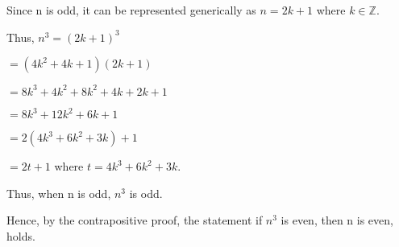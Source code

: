 \documentclass[a4paper,11pt]{article}
\begin{document}
\phantom{}

Since n is odd, it can be represented generically as $n = 2k+1$ where $k \in \mathbb{Z}$.

Thus, $n^3 = (2k+1)^3$

$ = (4k^2 + 4k + 1)(2k+1) $

$= 8k^3 + 4k^2 + 8k^2 + 4k + 2k + 1$

$= 8k^3 + 12k^2 + 6k + 1$

$= 2(4k^3 + 6k^2 + 3k) + 1$

$= 2t + 1$ where $t = 4k^3 + 6k^2 + 3k$.

Thus, when n is odd, $n^3$ is odd.

Hence, by the contrapositive proof, the statement if $n^3$ is even, then n is even, holds.   \fbox \\
\end{document}
